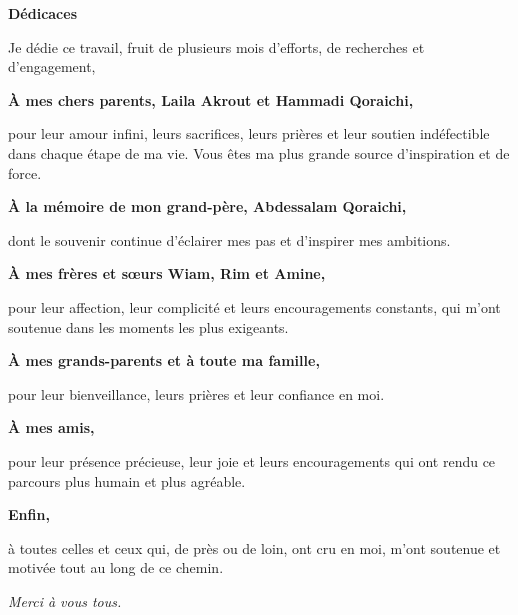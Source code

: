 \documentclass[12pt,a4paper]{report}
\begin{document}
\begin{center}
    {\Large\bfseries Dédicaces}\par
    \vspace{1.2cm}

    \begin{minipage}{0.85\linewidth}
    \centering
    Je dédie ce travail, fruit de plusieurs mois d’efforts, de recherches et d’engagement,\par
    \vspace{0.6em}

    \textbf{À mes chers parents, Laila Akrout et Hammadi Qoraichi,}\par
    pour leur amour infini, leurs sacrifices, leurs prières et leur soutien indéfectible
    dans chaque étape de ma vie. Vous êtes ma plus grande source d’inspiration et de force.\par
    \vspace{0.8em}

    \textbf{À la mémoire de mon grand-père, Abdessalam Qoraichi,}\par
    dont le souvenir continue d’éclairer mes pas et d’inspirer mes ambitions.\par
    \vspace{0.8em}

    \textbf{À mes frères et sœurs Wiam, Rim et Amine,}\par
    pour leur affection, leur complicité et leurs encouragements constants,
    qui m’ont soutenue dans les moments les plus exigeants.\par
    \vspace{0.8em}

    \textbf{À mes grands-parents et à toute ma famille,}\par
    pour leur bienveillance, leurs prières et leur confiance en moi.\par
    \vspace{0.8em}

    \textbf{À mes amis,}\par
    pour leur présence précieuse, leur joie et leurs encouragements qui ont rendu
    ce parcours plus humain et plus agréable.\par
    \vspace{0.8em}

    \textbf{Enfin,}\par
    à toutes celles et ceux qui, de près ou de loin, ont cru en moi,
    m’ont soutenue et motivée tout au long de ce chemin.\par
    \vspace{1.2em}

    \emph{Merci à vous tous.}
    \end{minipage}
\end{center}
\end{document}
